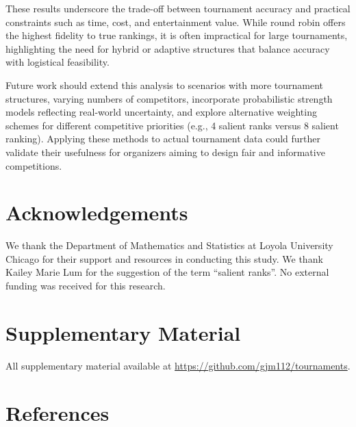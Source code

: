 \documentclass[
  12pt,
]{article}
\begin{document}
These results underscore the trade-off between tournament accuracy and
practical constraints such as time, cost, and entertainment value. While
round robin offers the highest fidelity to true rankings, it is often
impractical for large tournaments, highlighting the need for hybrid or
adaptive structures that balance accuracy with logistical feasibility.

Future work should extend this analysis to scenarios with more
tournament structures, varying numbers of competitors, incorporate
probabilistic strength models reflecting real-world uncertainty, and
explore alternative weighting schemes for different competitive
priorities (e.g., 4 salient ranks versus 8 salient ranking). Applying
these methods to actual tournament data could further validate their
usefulness for organizers aiming to design fair and informative
competitions.

\section*{Acknowledgements}\label{acknowledgements}

We thank the Department of Mathematics and Statistics at Loyola
University Chicago for their support and resources in conducting this
study. We thank Kailey Marie Lum for the suggestion of the term
``salient ranks''. No external funding was received for this research.

\section*{Supplementary Material}\label{supplementary-material}

All supplementary material available at
\url{https://github.com/gjm112/tournaments}.

\section{References}\label{references}
\end{document}
